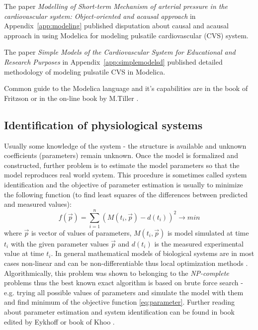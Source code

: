 The paper \cite{Kulhanek2014Modeling} \emph{Modelling of Short-term Mechanism of arterial pressure in the cardiovascular system: Object-oriented and acausal approach} in Appendix~\ref{app:modeling} published disputation about causal and acausal approach in using Modelica for modeling pulsatile cardiovascular (CVS) system. 

The paper \cite{Kulhanek2014mefanet} \emph{Simple Models of the Cardiovascular System for Educational and Research Purposes} in Appendix~\ref{app:simplemodelsd} published detailed methodology of modeling pulsatile CVS in Modelica. 

Common guide to the Modelica language and it's capabilities are in the book of Fritzson \cite{fritzson2002} or in the on-line book by M.Tiller \cite{Tiller2014}.


\subsection{Identification of physiological systems}
\label{sec:estimation}

Usually some knowledge of the system - the structure is available and unknown coefficients (parameters) remain unknown. Once the model is formalized and constructed, further problem is to estimate the model parameters so that the model reproduces real world system. This procedure is sometimes called system identification and the objective of parameter estimation is usually to minimize the following function (to find least squares of the differences between predicted and measured values):
\begin{equation} \label{eq:parameter} 
f( \vec{p} ) = \sum_{i=1}^{n} ( M(t_{i},\vec{p} ) - d(t_{i}) )^2 \to min  
\end{equation} 
where $\vec{p}$ is vector of values of parameters, $M(t_{i},\vec{p})$ is model simulated at time $t_{i} $ with the given parameter values $\vec{p}$ and $d(t_{i})$ is the measured experimental value at time $t_{i}$. 
In general mathematical models of biological systems are in most cases non-linear and can be non-differentiable thus local optimization methods . Algorithmically, this problem was shown to belonging to the \emph{NP-complete} problems \cite{Hofmann2005} thus the best known exact algorithm is based on brute force search - e.g. trying all possible values of parameters and simulate the model with them and find minimum of the objective function \ref{eq:parameter}.
Further reading about parameter estimation and system identification can be found in book edited by Eykhoff \cite{Eykhoff1981} or book of Khoo \cite[p.~159]{khoo2000}.

